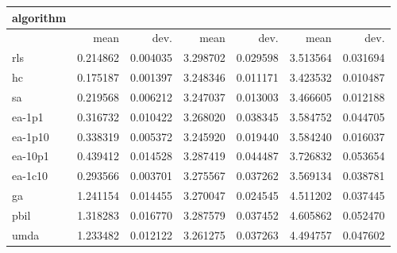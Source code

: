 \begin{tabular}{@{}l*{6}{>{{}}N{1}{2}}@{}}
\toprule
{algorithm} &  &  &  \\
\midrule
& {mean} & {dev.} & {mean} & {dev.} & {mean} & {dev.} \\
\midrule
rls & 0.214862 & 0.004035 & 3.298702 & 0.029598 & 3.513564 & 0.031694 \\
 hc & 0.175187 & 0.001397 & 3.248346 & 0.011171 & 3.423532 & 0.010487 \\
 sa & 0.219568 & 0.006212 & 3.247037 & 0.013003 & 3.466605 & 0.012188 \\
 ea-1p1 & 0.316732 & 0.010422 & 3.268020 & 0.038345 & 3.584752 & 0.044705 \\
 ea-1p10 & 0.338319 & 0.005372 & 3.245920 & 0.019440 & 3.584240 & 0.016037 \\
 ea-10p1 & 0.439412 & 0.014528 & 3.287419 & 0.044487 & 3.726832 & 0.053654 \\
 ea-1c10 & 0.293566 & 0.003701 & 3.275567 & 0.037262 & 3.569134 & 0.038781 \\
 ga & 1.241154 & 0.014455 & 3.270047 & 0.024545 & 4.511202 & 0.037445 \\
 pbil & 1.318283 & 0.016770 & 3.287579 & 0.037452 & 4.605862 & 0.052470 \\
 umda & 1.233482 & 0.012122 & 3.261275 & 0.037263 & 4.494757 & 0.047602 \\
 \bottomrule
\end{tabular}
